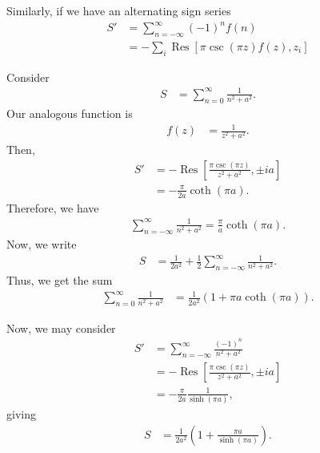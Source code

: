 \documentclass[10pt]{mypackage}
\DeclareMathOperator{\res}{Res}
\begin{document}
   Similarly, if we have an alternating sign series
   \begin{align*}
     S' &= \sum_{n=-\infty}^{\infty}\left( -1 \right)^{n}f(n)\\
        &= -\sum_{i}\res\left[ \pi\csc\left( \pi z \right)f(z),z_i \right]
   \end{align*}
   \begin{example}
     Consider
     \begin{align*}
       S &= \sum_{n=0}^{\infty}\frac{1}{n^2 + a^2}.
     \end{align*}
     Our analogous function is
     \begin{align*}
       f(z) &= \frac{1}{z^2 + a^2}.
     \end{align*}
     Then,
     \begin{align*}
       S' &= -\res\left[ \frac{\pi\csc\left( \pi z \right)}{z^2 + a^2} ,\pm ia\right]\\
         &= -\frac{\pi}{2a}\coth\left( \pi a \right).
     \end{align*}
     Therefore, we have
     \begin{align*}
       \sum_{n=-\infty}^{\infty} \frac{1}{n^2 + a^2} = \frac{\pi}{a}\coth\left( \pi a \right).
     \end{align*}
     Now, we write
     \begin{align*}
       S &= \frac{1}{2a^2} + \frac{1}{2}\sum_{n=-\infty}^{\infty}\frac{1}{n^2 + a^2}.
     \end{align*}
     Thus, we get the sum
     \begin{align*}
       \sum_{n=0}^{\infty}\frac{1}{n^2 + a^2} &= \frac{1}{2a^2}\left( 1 + \pi a \coth\left( \pi a \right) \right).
     \end{align*}
   \end{example}
   \begin{example}
     Now, we may consider
     \begin{align*}
       S' &= \sum_{n=-\infty}^{\infty}\frac{\left( -1 \right)^n}{n^2 + a^2}\\
         &= -\res\left[ \frac{\pi\csc\left( \pi z \right)}{z^2 + a^2},\pm ia \right]\\
         &= -\frac{\pi}{2a}\frac{1}{\sinh\left( \pi a \right)},
     \end{align*}
     giving
     \begin{align*}
       S &= \frac{1}{2a^2}\left( 1 + \frac{\pi a}{\sinh\left( \pi a \right)} \right).
     \end{align*}
   \end{example}
\end{document}
